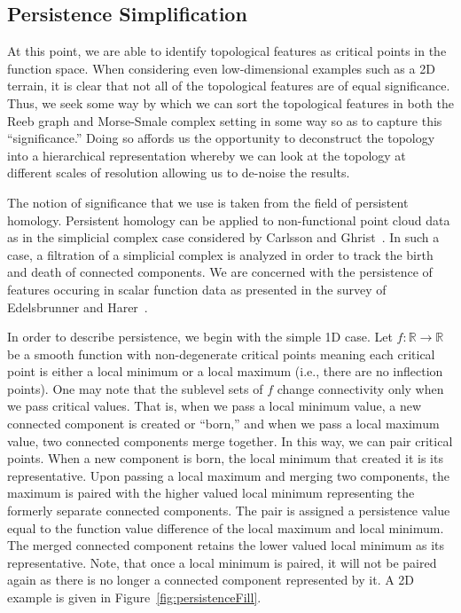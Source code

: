 \subsection{Persistence Simplification}
At this point, we are able to identify topological features as critical points in the function space.
%
When considering even low-dimensional examples such as a 2D terrain, it is clear that not all of the topological features are of equal significance.
%
Thus, we seek some way by which we can sort the topological features in both the Reeb graph and  Morse-Smale complex setting in some way so as to capture this ``significance.''
%
Doing so affords us the opportunity to deconstruct the topology into a hierarchical representation whereby we can look at the topology at different scales of resolution allowing us to de-noise the results.

The notion of significance that we use is taken from the field of persistent homology.
%
Persistent homology can be applied to non-functional point cloud data as in the simplicial complex case considered by Carlsson and Ghrist~\cite{Carlsson2009,Ghrist2009}.
%
In such a case, a filtration of a simplicial complex is analyzed in order to track the birth and death of connected components.
%
We are concerned with the persistence of features occuring in scalar function data as presented in the survey of Edelsbrunner and Harer~\cite{EdelsbrunnerHarer2008}.

In order to describe persistence, we begin with the simple 1D case.
%
Let $f: \mathbb{R} \rightarrow \mathbb{R}$ be a smooth function with non-degenerate critical points meaning each critical point is either a local minimum or a local maximum (i.e., there are no inflection points).
%
One may note that the sublevel sets of $f$ change connectivity only when we pass critical values.
%
That is, when we pass a local minimum value, a new connected component is created or ``born,'' and when we pass a local maximum value, two connected components merge together.
%
In this way, we can pair critical points.
%
When a new component is born, the local minimum that created it is its representative.
%
Upon passing a local maximum and merging two components, the maximum is paired with the higher valued local minimum representing the formerly separate connected components.
%
The pair is assigned a persistence value equal to the function value difference of the local maximum and local minimum.
%
The merged connected component retains the lower valued local minimum as its representative.
%
Note, that once a local minimum is paired, it will not be paired again as there is no longer a connected component represented by it.
%
A 2D example is given in Figure~\ref{fig:persistenceFill}.

